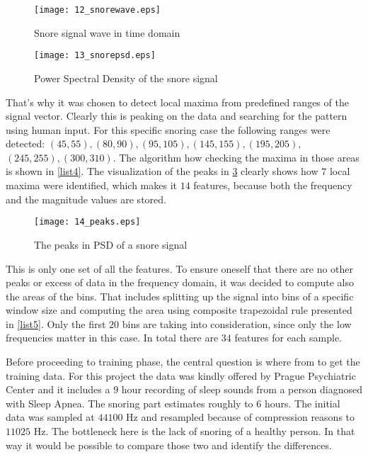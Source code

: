 \begin{figure}[!ht]
\centering
  \texttt{[image: 12\_snorewave.eps]}
\caption{Snore signal wave in time domain}
\label{fig:snorewave}
\end{figure}

\begin{figure}[!ht]
\centering
  \texttt{[image: 13\_snorepsd.eps]}
\caption{Power Spectral Density of the snore signal}
\label{fig:snorepsd}
\end{figure}

That's why it was chosen to detect local maxima from predefined ranges of the signal vector. Clearly this is peaking on the data and searching for the pattern using human input. For this specific snoring case the following ranges were detected: $(45, 55), (80, 90), (95, 105), (145, 155), (195, 205),$ $ (245, 255), (300, 310)$. The algorithm how checking the maxima in those areas is shown in \ref{list4}. The visualization of the peaks in \ref{fig:peaks} clearly shows how $7$ local maxima were identified, which makes it $14$ features, because both the frequency and the magnitude values are stored.

\begin{figure}[!ht]
\centering
  \texttt{[image: 14\_peaks.eps]}
\caption{The peaks in PSD of a snore signal}
\label{fig:peaks}
\end{figure}

This is only one set of all the features. To ensure oneself that there are no other peaks or excess of data in the frequency domain, it was decided to compute also the areas of the bins. That includes splitting up the signal into bins of a specific window size and computing the area using composite trapezoidal rule presented in \ref{list5}. Only the first $20$ bins are taking into consideration, since only the low frequencies matter in this case. In total there are $34$ features for each sample.



Before proceeding to training phase, the central question is where from to get the training data. For this project the data was kindly offered by Prague Psychiatric Center \cite{pcp} and it includes a $9$ hour recording of sleep sounds from a person diagnosed with Sleep Apnea. The snoring part estimates roughly to $6$ hours. The initial data was sampled at $44100$ Hz and resampled because of compression reasons to $11025$ Hz. The bottleneck here is the lack of snoring of a healthy person. In that way it would be possible to compare those two and identify the differences. 

